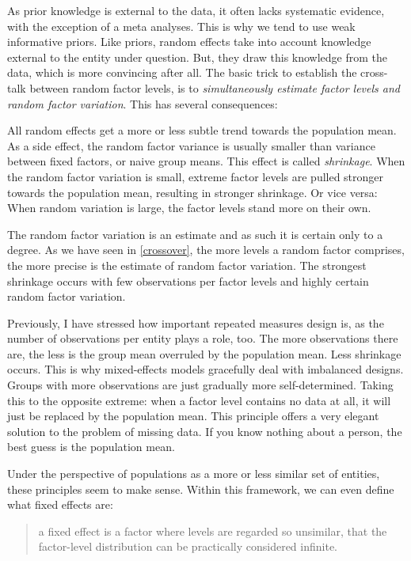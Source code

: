 \documentclass[]{svmono}
\begin{document}
As prior knowledge is external to the data, it often lacks systematic
evidence, with the exception of a meta analyses. This is why we tend to
use weak informative priors. Like priors, random effects take into
account knowledge external to the entity under question. But, they draw
this knowledge from the data, which is more convincing after all. The
basic trick to establish the cross-talk between random factor levels, is
to \emph{simultaneously estimate factor levels and random factor
variation}. This has several consequences:

All random effects get a more or less subtle trend towards the
population mean. As a side effect, the random factor variance is usually
smaller than variance between fixed factors, or naive group means. This
effect is called \emph{shrinkage}. When the random factor variation is
small, extreme factor levels are pulled stronger towards the population
mean, resulting in stronger shrinkage. Or vice versa: When random
variation is large, the factor levels stand more on their own.

The random factor variation is an estimate and as such it is certain
only to a degree. As we have seen in \ref{crossover}, the more levels a
random factor comprises, the more precise is the estimate of random
factor variation. The strongest shrinkage occurs with few observations
per factor levels and highly certain random factor variation.

Previously, I have stressed how important repeated measures design is,
as the number of observations per entity plays a role, too. The more
observations there are, the less is the group mean overruled by the
population mean. Less shrinkage occurs. This is why mixed-effects models
gracefully deal with imbalanced designs. Groups with more observations
are just gradually more self-determined. Taking this to the opposite
extreme: when a factor level contains no data at all, it will just be
replaced by the population mean. This principle offers a very elegant
solution to the problem of missing data. If you know nothing about a
person, the best guess is the population mean.

Under the perspective of populations as a more or less similar set of
entities, these principles seem to make sense. Within this framework, we
can even define what fixed effects are:

\begin{quote}
a fixed effect is a factor where levels are regarded so unsimilar, that
the factor-level distribution can be practically considered infinite.
\end{quote}
\end{document}
